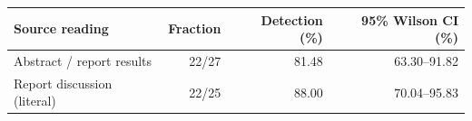 \begin{tabular}{lrrr}
\toprule
Source reading & Fraction & Detection (\%) & 95\% Wilson CI (\%) \\
\midrule
Abstract / report results & 22/27 & 81.48 & 63.30--91.82 \\
Report discussion (literal) & 22/25 & 88.00 & 70.04--95.83 \\
\bottomrule
\end{tabular}
